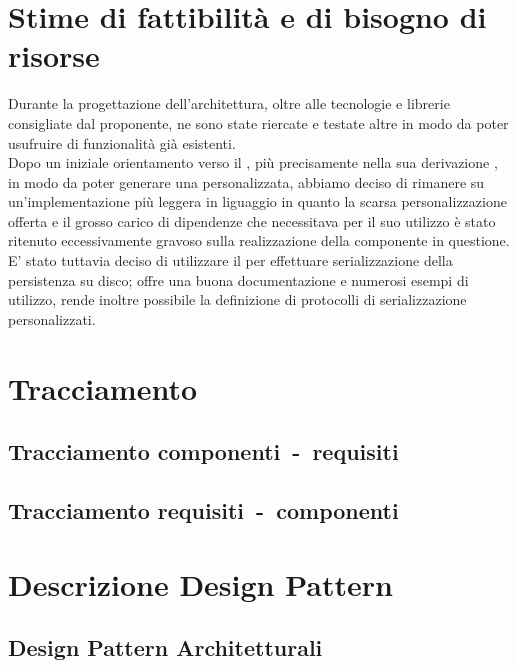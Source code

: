 \documentclass{scalatekids-article}
\begin{document}
\section{Stime di fattibilità e di bisogno di risorse}

Durante la progettazione dell'architettura, oltre alle tecnologie e librerie
consigliate dal proponente, ne sono state riercate e testate altre in modo da
poter usufruire di funzionalità già esistenti.\\ Dopo un iniziale orientamento
verso il  , più precisamente nella sua
derivazione , in modo da poter generare una 
personalizzata, abbiamo deciso di rimanere su un'implementazione più leggera in
liguaggio  in quanto la scarsa personalizzazione offerta e il
grosso carico di dipendenze che necessitava  per il suo
utilizzo è stato ritenuto eccessivamente gravoso sulla realizzazione della
componente in questione.\\ E' stato tuttavia deciso di utilizzare il
  per effettuare serializzazione della
persistenza su disco; offre una buona documentazione e numerosi esempi di
utilizzo, rende inoltre possibile la definizione di protocolli di
serializzazione personalizzati.

\section{Tracciamento}

\subsection{Tracciamento componenti\ -\ requisiti}

\subsection{Tracciamento requisiti\ -\ componenti}

\newpage
\appendix
\label{sec:appendice}

\section{Descrizione Design Pattern}

\subsection{Design Pattern Architetturali}
\end{document}
